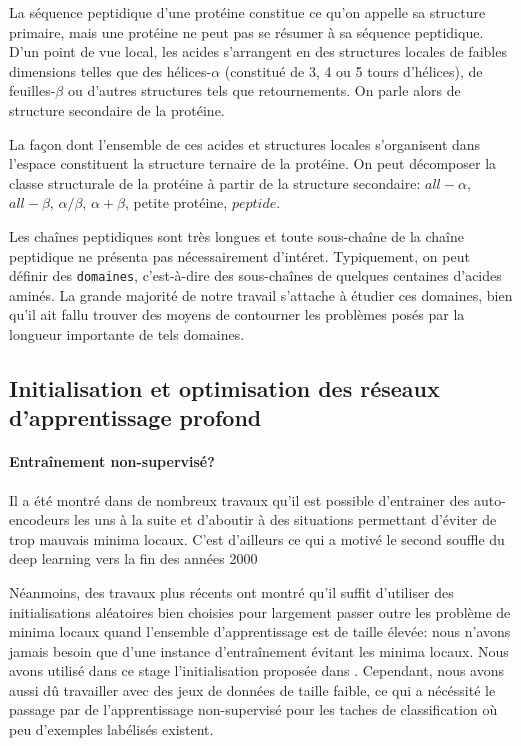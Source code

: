 \documentclass[a4paper, 11pt, onecolumn]{article}
\begin{document}
La séquence peptidique d'une protéine constitue ce qu'on appelle sa structure
primaire, mais une protéine ne peut pas se résumer à sa séquence peptidique.
D'un point de vue local, les acides s'arrangent en des structures locales de
faibles dimensions telles que des hélices-$\alpha$ (constitué de 3, 4 ou 5 tours
d'hélices), de feuilles-$\beta$ ou d'autres structures tels que retournements.
On parle alors de structure secondaire de la protéine.

La façon dont l'ensemble de ces acides et structures locales s'organisent dans
l'espace constituent la structure ternaire de la protéine. On peut décomposer la
classe structurale de la protéine à partir de la structure secondaire:
$all-\alpha$, $all-\beta$, $\alpha /\beta$, $\alpha + \beta$, petite protéine,
$peptide$.

Les chaînes peptidiques sont très longues et toute sous-chaîne de la chaîne
peptidique ne présenta pas nécessairement d'intéret. Typiquement, on peut
définir des \texttt{domaines}, c'est-à-dire des sous-chaînes de quelques
centaines d'acides aminés. La grande majorité de notre travail s'attache à
étudier ces domaines, bien qu'il ait fallu trouver des moyens de contourner les
problèmes posés par la longueur importante de tels domaines.

\subsection{Initialisation et optimisation des réseaux d'apprentissage profond}

\paragraph{Entraînement non-supervisé?}

Il a été montré dans de nombreux travaux qu'il est possible d'entrainer des
auto-encodeurs les uns à la suite et d'aboutir à des situations permettant
d'éviter de trop mauvais minima locaux. C'est d'ailleurs ce qui a motivé le
second souffle du deep learning vers la fin des années 2000

Néanmoins, des travaux plus récents ont montré qu'il suffit d'utiliser des
initialisations aléatoires bien choisies pour largement passer outre les problème
de minima locaux quand l'ensemble d'apprentissage est de taille élevée: nous n'avons jamais besoin que d'une instance d'entraînement
évitant les minima locaux. Nous avons utilisé dans ce stage l'initialisation
proposée dans . Cependant, nous avons aussi dû travailler avec des jeux de
données de taille faible, ce qui a nécéssité le passage par de l'apprentissage
non-supervisé pour les taches de classification où peu d'exemples labélisés existent.
\end{document}
